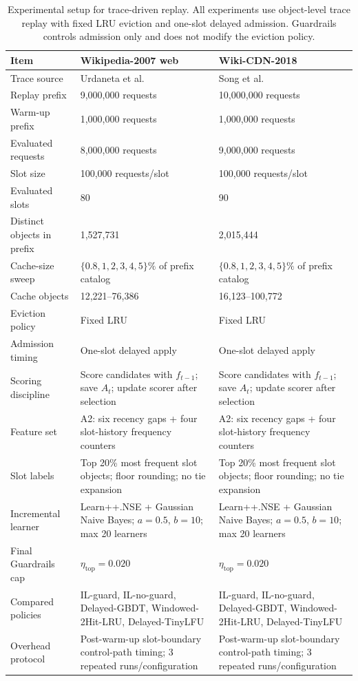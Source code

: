 \begin{table}[t]
\caption{Experimental setup for trace-driven replay. All experiments use object-level trace replay with fixed LRU eviction and one-slot delayed admission. Guardrails controls admission only and does not modify the eviction policy.}
\label{tab:experimental_setup}
\centering
\footnotesize
\begin{tabular}{lll}
\toprule
\textbf{Item} & \textbf{Wikipedia-2007 web} & \textbf{Wiki-CDN-2018} \\
\midrule
Trace source & Urdaneta et al. & Song et al. \\
Replay prefix & 9,000,000 requests & 10,000,000 requests \\
Warm-up prefix & 1,000,000 requests & 1,000,000 requests \\
Evaluated requests & 8,000,000 requests & 9,000,000 requests \\
Slot size & 100,000 requests/slot & 100,000 requests/slot \\
Evaluated slots & 80 & 90 \\
Distinct objects in prefix & 1,527,731 & 2,015,444 \\
Cache-size sweep & $\{0.8,1,2,3,4,5\}\%$ of prefix catalog & $\{0.8,1,2,3,4,5\}\%$ of prefix catalog \\
Cache objects & 12,221--76,386 & 16,123--100,772 \\
Eviction policy & Fixed LRU & Fixed LRU \\
Admission timing & One-slot delayed apply & One-slot delayed apply \\
Scoring discipline & Score candidates with $f_{t-1}$; save $A_t$; update scorer after selection & Score candidates with $f_{t-1}$; save $A_t$; update scorer after selection \\
Feature set & A2: six recency gaps + four slot-history frequency counters & A2: six recency gaps + four slot-history frequency counters \\
Slot labels & Top 20\% most frequent slot objects; floor rounding; no tie expansion & Top 20\% most frequent slot objects; floor rounding; no tie expansion \\
Incremental learner & Learn++.NSE + Gaussian Naive Bayes; $a=0.5$, $b=10$; max 20 learners & Learn++.NSE + Gaussian Naive Bayes; $a=0.5$, $b=10$; max 20 learners \\
Final Guardrails cap & $\eta_{\mathrm{top}}=0.020$ & $\eta_{\mathrm{top}}=0.020$ \\
Compared policies & IL-guard, IL-no-guard, Delayed-GBDT, Windowed-2Hit-LRU, Delayed-TinyLFU & IL-guard, IL-no-guard, Delayed-GBDT, Windowed-2Hit-LRU, Delayed-TinyLFU \\
Overhead protocol & Post-warm-up slot-boundary control-path timing; 3 repeated runs/configuration & Post-warm-up slot-boundary control-path timing; 3 repeated runs/configuration \\
\bottomrule
\end{tabular}
\end{table}
